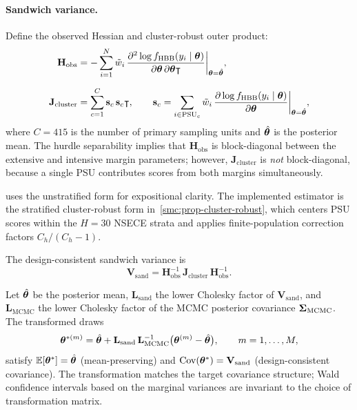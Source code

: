 \paragraph{Sandwich variance.}
Define the observed Hessian and cluster-robust outer product:
\begin{align}
  \mathbf{H}_{\mathrm{obs}}
    &= -\sum_{i=1}^{N}\tilde{w}_i\,
       \frac{\partial^2\log f_{\operatorname{HBB}}(y_i \mid \boldsymbol{\theta})}
            {\partial\boldsymbol{\theta}\,\partial\boldsymbol{\theta}\intercal}
       \bigg|_{\boldsymbol{\theta} = \hat{\boldsymbol{\theta}}},
    \label{eq:H-obs} \\[6pt]
  \mathbf{J}_{\mathrm{cluster}}
    &= \sum_{c=1}^{C}\mathbf{s}_c\,\mathbf{s}_c\intercal,
    \qquad
    \mathbf{s}_c
    = \sum_{i \in \text{PSU}_c}\tilde{w}_i\,
      \frac{\partial\log f_{\operatorname{HBB}}(y_i \mid \boldsymbol{\theta})}{\partial\boldsymbol{\theta}}
      \bigg|_{\boldsymbol{\theta} = \hat{\boldsymbol{\theta}}},
    \label{eq:J-cluster}
\end{align}
where $C = 415$ is the number of primary sampling units and $\hat{\boldsymbol{\theta}}$ is
the posterior mean. The hurdle separability implies that
$\mathbf{H}_{\mathrm{obs}}$ is block-diagonal between the extensive and
intensive margin parameters; however, $\mathbf{J}_{\mathrm{cluster}}$ is
\emph{not} block-diagonal, because a single PSU contributes scores from both
margins simultaneously.

\begin{remark}\label{rem:J-simplified}
   uses the unstratified form for expositional
  clarity.  The implemented estimator is the stratified cluster-robust
  form in~\cref{smc:prop-cluster-robust}, which centers PSU scores
  within the $H = 30$ NSECE strata and applies finite-population
  correction factors $C_h/(C_h - 1)$.
\end{remark}

The design-consistent sandwich variance is
\begin{equation}\label{eq:V-sand}
  \mathbf{V}_{\mathrm{sand}}
  = \mathbf{H}_{\mathrm{obs}}^{-1}\,
    \mathbf{J}_{\mathrm{cluster}}\,
    \mathbf{H}_{\mathrm{obs}}^{-1}.
\end{equation}

\begin{theorem}\label{thm:cholesky}
  Let $\hat{\boldsymbol{\theta}}$ be the posterior mean, $\mathbf{L}_{\mathrm{sand}}$ the
  lower Cholesky factor of $\mathbf{V}_{\mathrm{sand}}$, and
  $\mathbf{L}_{\mathrm{MCMC}}$ the lower Cholesky factor of the MCMC posterior
  covariance $\boldsymbol{\Sigma}_{\mathrm{MCMC}}$. The transformed draws
  \begin{equation}\label{eq:cholesky-transform}
    \boldsymbol{\theta}^{*(m)}
    = \hat{\boldsymbol{\theta}}
    + \mathbf{L}_{\mathrm{sand}}\,\mathbf{L}_{\mathrm{MCMC}}^{-1}
      \bigl(\boldsymbol{\theta}^{(m)} - \hat{\boldsymbol{\theta}}\bigr),
    \qquad m = 1,\ldots,M,
  \end{equation}
  satisfy $\mathbb{E}[\boldsymbol{\theta}^*] = \hat{\boldsymbol{\theta}}$ (mean-preserving) and
  $\operatorname*{Cov}(\boldsymbol{\theta}^*) = \mathbf{V}_{\mathrm{sand}}$
  (design-consistent covariance).  The transformation matches
  the target covariance structure; Wald confidence intervals
  based on the marginal variances are invariant to the choice
  of transformation matrix.
\end{theorem}

